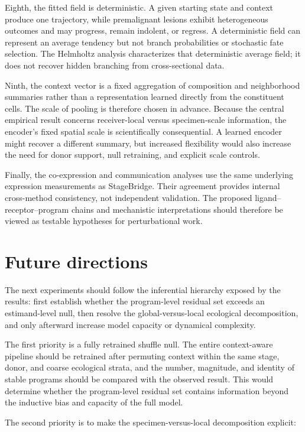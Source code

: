 Eighth, the fitted field is deterministic. A given starting state and context produce one trajectory, while premalignant lesions exhibit heterogeneous outcomes and may progress, remain indolent, or regress. A deterministic field can represent an average tendency but not branch probabilities or stochastic fate selection. The Helmholtz analysis characterizes that deterministic average field; it does not recover hidden branching from cross-sectional data.

Ninth, the context vector is a fixed aggregation of composition and neighborhood summaries rather than a representation learned directly from the constituent cells. The scale of pooling is therefore chosen in advance. Because the central empirical result concerns receiver-local versus specimen-scale information, the encoder's fixed spatial scale is scientifically consequential. A learned encoder might recover a different summary, but increased flexibility would also increase the need for donor support, null retraining, and explicit scale controls.

Finally, the co-expression and communication analyses use the same underlying expression measurements as StageBridge. Their agreement provides internal cross-method consistency, not independent validation. The proposed ligand--receptor--program chains and mechanistic interpretations should therefore be viewed as testable hypotheses for perturbational work.

\section{Future directions}
\label{sec:discussion-future}

The next experiments should follow the inferential hierarchy exposed by the results: first establish whether the program-level residual set exceeds an estimand-level null, then resolve the global-versus-local ecological decomposition, and only afterward increase model capacity or dynamical complexity.

The first priority is a fully retrained shuffle null. The entire context-aware pipeline should be retrained after permuting context within the same stage, donor, and coarse ecological strata, and the number, magnitude, and identity of stable programs should be compared with the observed result. This would determine whether the program-level residual set contains information beyond the inductive bias and capacity of the full model.

The second priority is to make the specimen-versus-local decomposition explicit:

